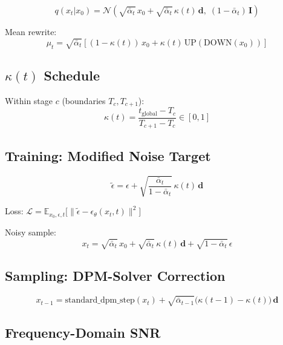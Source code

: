 \documentclass[11pt, a4paper]{article}
\newcommand{\alphabar}{\bar{\alpha}}
\begin{document}
\begin{equation}
    \boxed{q(x_t | x_0) = \mathcal{N}\!\left(\sqrt{\alphabar_t}\, x_0 + \sqrt{\alphabar_t}\, \kappa(t)\, \mathbf{d},\; (1-\alphabar_t)\,\mathbf{I}\right)}
\end{equation}

Mean rewrite:
\begin{equation}
    \mu_t = \sqrt{\alphabar_t}\left[(1-\kappa(t))\, x_0 + \kappa(t)\, \mathrm{UP}(\mathrm{DOWN}(x_0))\right]
\end{equation}

\subsection{$\kappa(t)$ Schedule}

Within stage $c$ (boundaries $T_c, T_{c+1}$):
\begin{equation}
    \kappa(t) = \frac{t_{\mathrm{global}} - T_c}{T_{c+1} - T_c} \in [0,1]
\end{equation}

\subsection{Training: Modified Noise Target}

\begin{equation}
    \boxed{\tilde{\epsilon} = \epsilon + \sqrt{\frac{\alphabar_t}{1-\alphabar_t}}\, \kappa(t)\, \mathbf{d}}
\end{equation}

Loss: $\mathcal{L} = \mathbb{E}_{x_0,\epsilon,t}\bigl[\|\tilde{\epsilon} - \epsilon_\theta(x_t, t)\|^2\bigr]$

Noisy sample:
\begin{equation}
    x_t = \sqrt{\alphabar_t}\, x_0 + \sqrt{\alphabar_t}\, \kappa(t)\, \mathbf{d} + \sqrt{1-\alphabar_t}\, \epsilon
\end{equation}

\subsection{Sampling: DPM-Solver Correction}

\begin{equation}
    \boxed{x_{t-1} = \mathrm{standard\_dpm\_step}(x_t) + \sqrt{\alphabar_{t-1}}\bigl(\kappa(t{-}1) - \kappa(t)\bigr)\, \mathbf{d}}
\end{equation}

\subsection{Frequency-Domain SNR}
\end{document}
